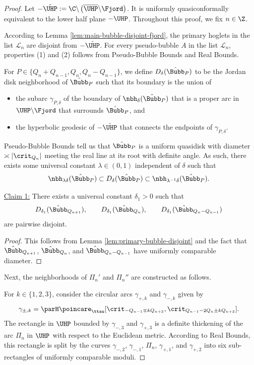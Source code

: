 \documentclass{amsart}
\begin{document}
\begin{proof}
    Let $-\hat{\UHP} := \C \backslash \left( \overline{\UHP} \backslash \Fjord \right)$. 
    It is uniformly quasiconformally equivalent to the lower half plane $-\UHP$.
    Throughout this proof, we fix $n \in \Z$.
    
    According to Lemma \ref{lem:main-bubble-disjoint-fjord}, the primary hoglets in the list $\mathcal{L}_n$ are disjoint from $-\hat{\UHP}$.
    For every pseudo-bubble $A$ in the list $\mathcal{L}_n$, 
    properties (1) and (2) follows from Pseudo-Bubble Bounds and Real Bounds.
    
    For $P \in \{Q_n+Q_{n-1},Q_n,Q_n-Q_{n-1}\}$, 
    we define $D_\delta(\hat{\Bubb}_P)$ to be the Jordan disk neighborhood of $\hat{\Bubb}_P$ such that its boundary is the union of 
        \begin{itemize}
            \item the subarc $\gamma_{P,\delta}$ of the boundary of $\nbh_{\delta} (\hat{\Bubb}_P)$ that is a proper arc in $\UHP \backslash \Fjord$ that surrounds $\hat{\Bubb}_P$, and
            \item the hyperbolic geodesic of $-\hat{\UHP}$ that connects the endpoints of $\gamma_{P,\delta}$.
        \end{itemize}
    Pseudo-Bubble Bounds tell us that $\hat{\Bubb}_P$ is a uniform quasidisk with diameter $\asymp |\crit_{Q_n}|$ meeting the real line at its root with definite angle.
    As such, there exists some universal constant $\lambda \in (0,1)$ independent of $\delta$ such that 
        \[
            \nbh_{\lambda \delta}(\hat{\Bubb}_P) \subset D_\delta(\hat{\Bubb}_P) \subset \nbh_{\lambda^{-1} \delta}(\hat{\Bubb}_P).
        \]

    \noindent \underline{Claim 1:} There exists a universal constant $\delta_1>0$ such that
    \[
        D_{\delta_1}(\hat{\Bubb}_{Q_{n+1}}), \qquad D_{\delta_1}(\hat{\Bubb}_{Q_{n}}), \qquad D_{\delta_1}(\hat{\Bubb}_{Q_n-Q_{n-1}})
    \]
    are pairwise disjoint.
    
    \begin{proof}
        This follows from Lemma \ref{lem:primary-bubble-disjoint} and the fact that $\hat{\Bubb}_{Q_{n+1}}$, $\hat{\Bubb}_{Q_{n}}$, and $\hat{\Bubb}_{Q_n-Q_{n-1}}$ have uniformly comparable diameter.
    \end{proof}
    
    Next, the neighborhoods of $\Pi_n'$ and $\Pi_n''$ are constructed as follows.
    
    For $k \in \{1,2,3\}$, consider the circular arcs $\gamma_{+,k}$ and $\gamma_{-,k}$ given by
        \[
        \gamma_{\pm,k} = \parH \poincare_{\ttau}
        [\crit_{-Q_{n-1} \mp kQ_{n+3}},\crit_{Q_{n-1}-2Q_{n} \pm k Q_{n+3}}].
        \]
    The rectangle in $\UHP$ bounded by $\gamma_{-,3}$ and $\gamma_{+,3}$ is a definite thickening of the arc $\Pi_n$ in $\UHP$ with respect to the Euclidean metric.
    According to Real Bounds, this rectangle is split by the curves $\gamma_{-,2}$, $\gamma_{-,1}$, $\Pi_n$, $\gamma_{+,1}$, and $\gamma_{+,2}$ into six sub-rectangles of uniformly comparable moduli.
    

\end{proof}
\end{document}
